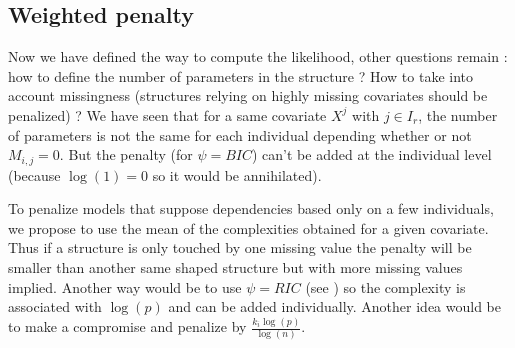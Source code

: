\documentclass[11pt,a4paper]{report}
\begin{document}
					
			
		\subsection{Weighted penalty}
			Now we have defined the way to compute the likelihood, other questions remain : how to define the number of parameters in the structure ?		How to take into account missingness (structures relying on highly missing covariates should be penalized) ?
			We have seen that for a same covariate $X^j$ with $ j \in I_r$, the number of parameters is not the same for each individual depending whether or not $M_{i,j}=0$. But the penalty (for $\psi=BIC$) can't be added at the individual level (because $\log(1)=0$ so it would be annihilated). 
			
			To penalize models that suppose dependencies based only on a few individuals, we propose to use the mean of the complexities obtained for a given covariate. Thus if a structure is only touched by one missing value the penalty will be smaller than another same shaped structure but with more missing values implied.
			Another way would be to use $\psi=RIC$ (see \cite{foster1994risk}) so the complexity is associated with $\log(p)$ and can be added individually. Another idea would be to make a compromise and penalize by $\frac{k_i\log(p)}{\log(n)}$.
		
%	
		
\end{document}
